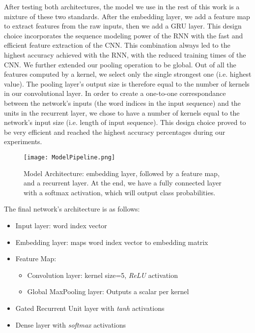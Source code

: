 After testing both architectures, the model we use in the rest of this work is a mixture of these two standards.
After the embedding layer, we add a feature map to extract features from the raw inputs,
then we add a GRU layer. This design choice incorporates the sequence modeling power of the RNN with the fast and efficient feature extraction of the CNN.
This combination always led to the highest accuracy achieved with the RNN, with the reduced training times of the CNN.
We further extended our pooling operation to be global. Out of all the features computed by a kernel, we select only the single strongest one
(i.e. highest value). The pooling layer's output size is therefore equal to the number of kernels in our convolutional layer. In order to create
a one-to-one correspondance between the network's inputs (the word indices in the input sequence) and the units in the recurrent layer, we chose to have
a number of kernels equal to the network's input size (i.e. length of input sequence).
This design choice proved to be very efficient and reached the highest accuracy percentages during our experiments.

\begin{figure}[H]
\centering
\texttt{[image: ModelPipeline.png]}
\caption{Model Architecture: embedding layer, followed by a feature map, and a recurrent layer. At the end, we have
a fully connected layer with a softmax activation, which will output class probabilities.}
\end{figure}

The final network's architecture is as follows:
\begin{itemize}
  \item Input layer: word index vector
  \item Embedding layer: maps word index vector to embedding matrix
  \item Feature Map:
      \begin{itemize}
        \item Convolution layer: kernel size=5, \textit{ReLU} activation
        \item Global MaxPooling layer: Outputs a scalar per kernel
      \end{itemize}
\item Gated Recurrent Unit layer with \textit{tanh} activations
\item Dense layer with \textit{softmax} activations
\end{itemize}

